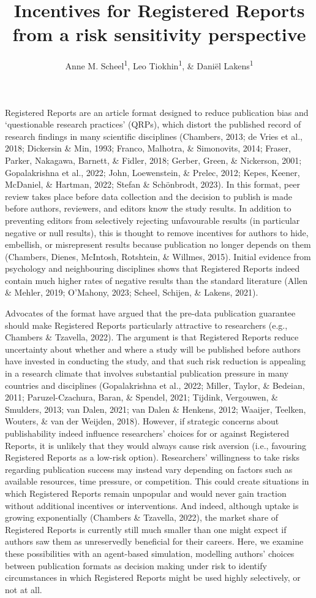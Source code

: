 \documentclass[
  ,man,mask,floatsintext]{apa6}
\title{Incentives for Registered Reports from a risk sensitivity perspective}
\author{Anne M. Scheel\textsuperscript{1}, Leo Tiokhin\textsuperscript{1}, \& Daniël Lakens\textsuperscript{1}}
\date{}
\affiliation{\vspace{0.5cm}\textsuperscript{1} Eindhoven University of Technology}
\begin{document}
\maketitle

Registered Reports are an article format designed to reduce publication bias and `questionable research practices' (QRPs), which distort the published record of research findings in many scientific disciplines (Chambers, 2013; de Vries et al., 2018; Dickersin \& Min, 1993; Franco, Malhotra, \& Simonovits, 2014; Fraser, Parker, Nakagawa, Barnett, \& Fidler, 2018; Gerber, Green, \& Nickerson, 2001; Gopalakrishna et al., 2022; John, Loewenstein, \& Prelec, 2012; Kepes, Keener, McDaniel, \& Hartman, 2022; Stefan \& Schönbrodt, 2023).
In this format, peer review takes place before data collection and the decision to publish is made before authors, reviewers, and editors know the study results.
In addition to preventing editors from selectively rejecting unfavourable results (in particular negative or null results), this is thought to remove incentives for authors to hide, embellish, or misrepresent results because publication no longer depends on them
(Chambers, Dienes, McIntosh, Rotshtein, \& Willmes, 2015).
Initial evidence from psychology and neighbouring disciplines shows that Registered Reports indeed contain much higher rates of negative results than the standard literature (Allen \& Mehler, 2019; O'Mahony, 2023; Scheel, Schijen, \& Lakens, 2021).

Advocates of the format have argued that the pre-data publication guarantee should make Registered Reports particularly attractive to researchers (e.g., Chambers \& Tzavella, 2022).
The argument is that Registered Reports reduce uncertainty about whether and where a study will be published before authors have invested in conducting the study, and that such risk reduction is appealing
in a research climate that involves substantial publication pressure in many countries and disciplines (Gopalakrishna et al., 2022; Miller, Taylor, \& Bedeian, 2011; Paruzel-Czachura, Baran, \& Spendel, 2021; Tijdink, Vergouwen, \& Smulders, 2013; van Dalen, 2021; van Dalen \& Henkens, 2012; Waaijer, Teelken, Wouters, \& van der Weijden, 2018).
However, if strategic concerns about publishability indeed influence researchers' choices for or against Registered Reports, it is unlikely that they would always cause risk aversion (i.e., favouring Registered Reports as a low-risk option).
Researchers' willingness to take risks regarding publication success may instead vary depending on factors such as available resources, time pressure, or competition.
This could create situations in which Registered Reports remain unpopular and would never gain traction without additional incentives or interventions.
And indeed, although uptake is growing exponentially (Chambers \& Tzavella, 2022), the market share of Registered Reports is currently still much smaller than one might expect if authors saw them as unreservedly beneficial for their careers.
Here, we examine these possibilities with an agent-based simulation, modelling authors' choices between publication formats as decision making under risk to identify circumstances in which Registered Reports might be used highly selectively, or not at all.
\end{document}
